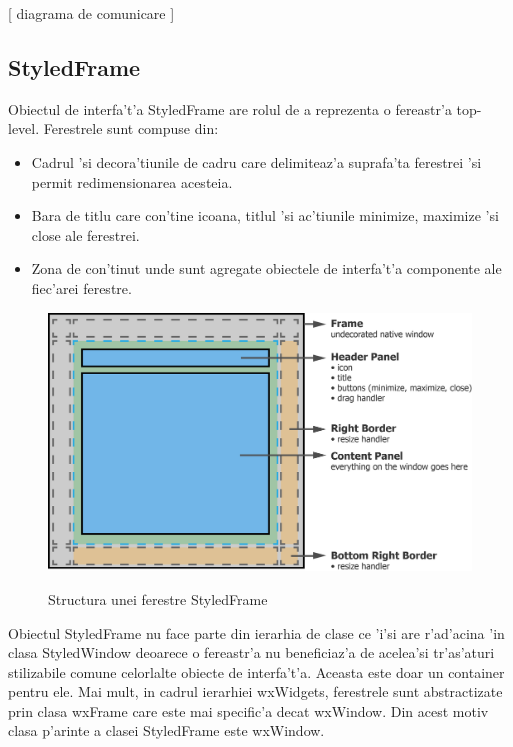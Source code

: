 [ diagrama de comunicare ]


\subsection{StyledFrame}

Obiectul de interfa't'a StyledFrame are rolul de a reprezenta o fereastr'a top-level. Ferestrele sunt compuse din:

\begin{itemize}
\item Cadrul 'si decora'tiunile de cadru care delimiteaz'a suprafa'ta ferestrei 'si permit redimensionarea acesteia.
\item Bara de titlu care con'tine icoana, titlul 'si ac'tiunile minimize, maximize 'si close ale ferestrei.
\item Zona de con'tinut unde sunt agregate obiectele de interfa't'a componente ale fiec'arei ferestre.
\end{itemize}

\begin{center}
\begin{figure}[H]
    \centering
    \includegraphics[scale=0.8]{img/ch5_styledframe.png}
    \label{fig:fig_5_2}
    \caption{Structura unei ferestre StyledFrame}
\end{figure}
\end{center}

Obiectul StyledFrame nu face parte din ierarhia de clase ce 'i'si are r'ad'acina 'in clasa StyledWindow deoarece o fereastr'a nu beneficiaz'a de acelea'si tr'as'aturi stilizabile comune celorlalte obiecte de interfa't'a. Aceasta este doar un container pentru ele. Mai mult, in cadrul ierarhiei wxWidgets, ferestrele sunt abstractizate prin clasa wxFrame care este mai specific'a decat wxWindow. Din acest motiv clasa p'arinte a clasei StyledFrame este wxWindow.

